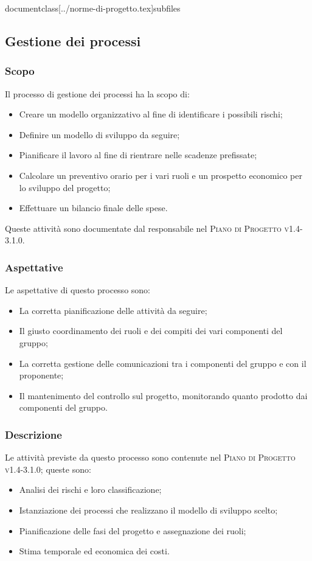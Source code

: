 documentclass[../norme-di-progetto.tex]{subfiles}


\subsection{Gestione dei processi}
\subsubsection{Scopo}
Il processo di gestione dei processi ha la scopo di:
\begin{itemize}
  \item Creare un modello organizzativo al fine di identificare i possibili rischi;
  \item Definire un modello di sviluppo da seguire;
  \item Pianificare il lavoro al fine di rientrare nelle scadenze prefissate;
  \item Calcolare un preventivo orario per i vari ruoli e un prospetto economico per lo sviluppo del progetto;
  \item Effettuare un bilancio finale delle spese.
\end{itemize}
Queste attività sono documentate dal responsabile nel \textsc{Piano di Progetto v1.4-3.1.0}.

\subsubsection{Aspettative}
Le aspettative di questo processo sono:
\begin{itemize}
  \item La corretta pianificazione delle attività da seguire;
  \item Il giusto coordinamento dei ruoli e dei compiti dei vari componenti del gruppo;
  \item La corretta gestione delle comunicazioni tra i componenti del gruppo e con il proponente;
  \item Il mantenimento del controllo sul progetto, monitorando quanto prodotto dai componenti del gruppo.
\end{itemize}

\subsubsection{Descrizione}
Le attività previste da questo processo sono contenute nel \textsc{Piano di Progetto v1.4-3.1.0}; queste sono:
\begin{itemize}
  \item Analisi dei rischi e loro classificazione;
  \item Istanziazione dei processi che realizzano il modello di sviluppo scelto;
  \item Pianificazione delle fasi del progetto e assegnazione dei ruoli;
  \item Stima temporale ed economica dei costi.
\end{itemize}

